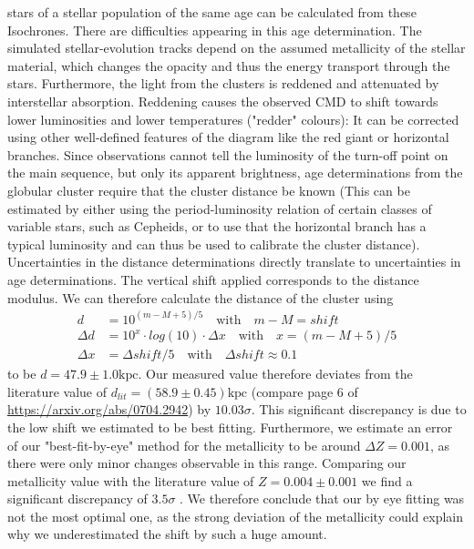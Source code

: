 stars of a stellar population of the same age can be calculated from these Isochrones. There are difficulties appearing in this age determination. The simulated stellar-evolution tracks depend on the assumed metallicity of the stellar material, which changes the opacity and thus the energy transport through the stars. Furthermore, the light from the clusters is reddened and attenuated by interstellar absorption. Reddening causes the observed CMD to shift towards lower luminosities and lower temperatures ("redder" colours): It can be corrected using other well-defined features of the diagram like the red giant or horizontal branches. Since observations cannot tell the luminosity of the turn-off point on the main sequence, but only its apparent brightness, age determinations from the globular cluster require that the cluster distance be known (This can be estimated by either using the period-luminosity relation of certain classes of variable stars, such as Cepheids, or to use that the horizontal branch has a typical luminosity and can thus be used to calibrate the cluster distance). Uncertainties in the distance determinations directly translate to uncertainties in age determinations.
The vertical shift applied corresponds to the distance modulus. We can therefore calculate the distance of the cluster using
\begin{align}
	d &= 10^{\left(m-M+5\right)/5} \quad \mathrm{with} \quad m-M=shift \\
	\Delta d &= 10^x \cdot log(10) \cdot \Delta x \quad \mathrm{with} \quad x ={\left(m-M+5\right)/5}\nonumber\\
	\Delta x &= \Delta shift /5 \quad \mathrm{with} \quad \Delta shift \approx 0.1 \nonumber
\end{align}
to be $d = 47.9 \pm 1.0 \mathrm{kpc}$. Our measured value therefore deviates from the literature value of $d_{lit} = (58.9 \pm 0.45) \mathrm{kpc} $ (compare page 6 of \url{https://arxiv.org/abs/0704.2942}) by $10.03 \sigma$. This significant discrepancy is due to the low shift we estimated to be best fitting. Furthermore, we estimate an error of our "best-fit-by-eye" method for the metallicity to be around $\Delta Z=0.001$, as there were only minor changes observable in this range. Comparing our metallicity value with the literature value of $Z=0.004 \pm 0.001$ we find a significant discrepancy of $3.5\sigma$ . We therefore conclude that our by eye fitting was not the most optimal one, as the strong deviation of the metallicity could explain why we underestimated the shift by such a huge amount.
